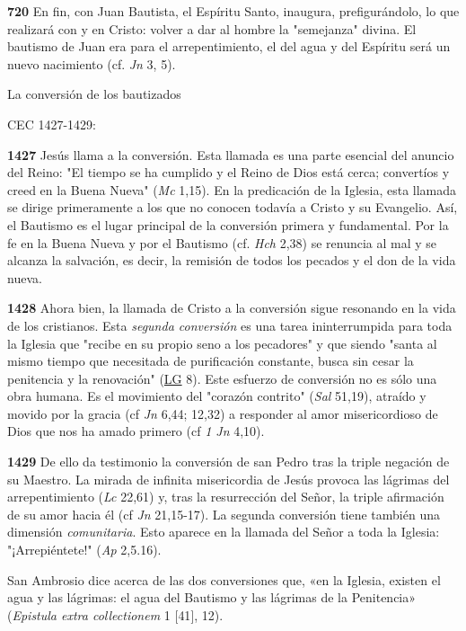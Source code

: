 \documentclass[]{article}
\begin{document}
\textbf{720} En fin, con Juan Bautista, el Espíritu Santo, inaugura,
prefigurándolo, lo que realizará con y en Cristo: volver a dar al hombre
la "semejanza" divina. El bautismo de Juan era para el arrepentimiento,
el del agua y del Espíritu será un nuevo nacimiento (cf. \emph{Jn} 3,
5).

La conversión de los bautizados

CEC 1427-1429:

\textbf{1427} Jesús llama a la conversión. Esta llamada es una parte
esencial del anuncio del Reino: "El tiempo se ha cumplido y el Reino de
Dios está cerca; convertíos y creed en la Buena Nueva" (\emph{Mc} 1,15).
En la predicación de la Iglesia, esta llamada se dirige primeramente a
los que no conocen todavía a Cristo y su Evangelio. Así, el Bautismo es
el lugar principal de la conversión primera y fundamental. Por la fe en
la Buena Nueva y por el Bautismo (cf. \emph{Hch} 2,38) se renuncia al
mal y se alcanza la salvación, es decir, la remisión de todos los
pecados y el don de la vida nueva.

\textbf{1428} Ahora bien, la llamada de Cristo a la conversión sigue
resonando en la vida de los cristianos. Esta \emph{segunda conversión}
es una tarea ininterrumpida para toda la Iglesia que "recibe en su
propio seno a los pecadores" y que siendo "santa al mismo tiempo que
necesitada de purificación constante, busca sin cesar la penitencia y la
renovación"
(\href{http://www.vatican.va/archive/hist_councils/ii_vatican_council/documents/vat-ii_const_19641121_lumen-gentium_sp.html}{LG}
8). Este esfuerzo de conversión no es sólo una obra humana. Es el
movimiento del "corazón contrito" (\emph{Sal} 51,19), atraído y movido
por la gracia (cf \emph{Jn} 6,44; 12,32) a responder al amor
misericordioso de Dios que nos ha amado primero (cf \emph{1 Jn} 4,10).

\textbf{1429} De ello da testimonio la conversión de san Pedro tras la
triple negación de su Maestro. La mirada de infinita misericordia de
Jesús provoca las lágrimas del arrepentimiento (\emph{Lc} 22,61) y, tras
la resurrección del Señor, la triple afirmación de su amor hacia él (cf
\emph{Jn} 21,15-17). La segunda conversión tiene también una dimensión
\emph{comunitaria}. Esto aparece en la llamada del Señor a toda la
Iglesia: "¡Arrepiéntete!" (\emph{Ap} 2,5.16).

San Ambrosio dice acerca de las dos conversiones que, «en la Iglesia,
existen el agua y las lágrimas: el agua del Bautismo y las lágrimas de
la Penitencia» (\emph{Epistula extra collectionem} 1 {[}41{]}, 12).
\end{document}
